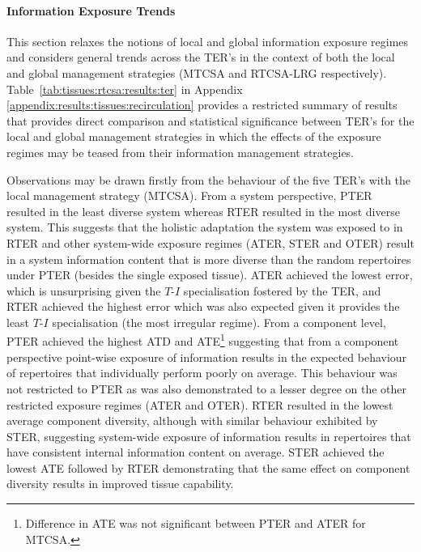 %
%
\paragraph{Information Exposure Trends}
This section relaxes the notions of local and global information exposure regimes and considers general trends across the TER's in the context of both the local and global management strategies (MTCSA and RTCSA-LRG respectively). Table~\ref{tab:tissues:rtcsa:results:ter} in Appendix \ref{appendix:results:tissues:recirculation} provides a restricted summary of results that provides direct comparison and statistical significance between TER's for the local and global management strategies in which the effects of the exposure regimes may be teased from their information management strategies. 

Observations may be drawn firstly from the behaviour of the five TER's with the local management strategy (MTCSA). 
From a system perspective, PTER resulted in the least diverse system whereas RTER resulted in the most diverse system. This suggests that the holistic adaptation the system was exposed to in RTER and other system-wide exposure regimes (ATER, STER and OTER) result in a system information content that is more diverse than the random repertoires under PTER (besides the single exposed tissue). ATER achieved the lowest error, which is unsurprising given the $T$-$I$ specialisation fostered by the TER, and RTER achieved the highest error which was also expected given it provides the least $T$-$I$ specialisation (the most irregular regime).
From a component level, PTER achieved the highest ATD and ATE\footnote{Difference in ATE was not significant between PTER and ATER for MTCSA.} suggesting that from a component perspective point-wise exposure of information results in the expected behaviour of repertoires that individually perform poorly on average. This behaviour was not restricted to PTER as was also demonstrated to a lesser degree on the other restricted exposure regimes (ATER and OTER). RTER resulted in the lowest average component diversity, although with similar behaviour exhibited by STER, suggesting system-wide exposure of information results in repertoires that have consistent internal information content on average. STER achieved the lowest ATE followed by RTER demonstrating that the same effect on component diversity results in improved tissue capability.

